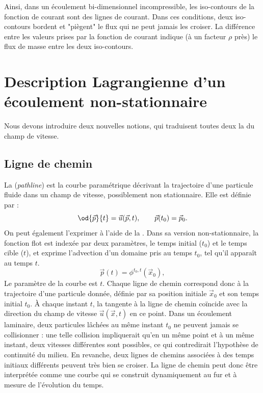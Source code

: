 Ainsi, dans un écoulement bi-dimensionnel incompressible, les iso-contours de la fonction de courant sont des lignes de courant. Dans ces conditions, deux iso-contours bordent et "piègent" le flux qui ne peut jamais les croiser. La différence entre les valeurs prises par la fonction de courant indique (à un facteur $\rho$ près) le flux de masse entre les deux iso-contours.

\section{Description Lagrangienne d'un écoulement non-stationnaire}
Nous devons introduire deux nouvelles notions, qui traduisent toutes deux la  du champ de vitesse.

\subsection{Ligne de chemin}
La  (\emph{pathline}) est la courbe paramétrique décrivant la trajectoire d’une particule fluide dans un champ de vitesse, possiblement non stationnaire. Elle est définie par :
\begin{equation}
  \od{\vec{p}}{t} = \vec{u}(\vec{p},t), \qquad \vec{p}(t_0) = \vec{p}_0.
  \label{eq:ligne_chemin}
\end{equation}
On peut également l’exprimer à l’aide de la . Dans sa version non-stationnaire, la fonction flot est indexée par deux paramètres, le temps initial ($t_0$) et le temps cible ($t$), et exprime l'advection d'un domaine pris au temps $t_0$, tel qu'il apparaît au temps $t$.
\begin{equation}
  \vec{p}(t) = \phi^{t_0, t }(\vec{x}_0),
  \label{eq:ligne_chemin_flot}
\end{equation}
Le paramètre de la courbe est $t$.
Chaque ligne de chemin correspond donc à la trajectoire d’une particule donnée, définie par sa position initiale $\vec{x}_0$ et son temps initial $t_0$.
À chaque instant $t$, la tangente à la ligne de chemin coïncide avec la direction du champ de vitesse $\vec{u}(\vec{x},t)$ en ce point.
Dans un écoulement laminaire, deux particules lâchées au même instant $t_0$ ne peuvent jamais se collisionner : une telle collision impliquerait qu’en un même point et à un même instant, deux vitesses différentes sont possibles, ce qui contredirait l’hypothèse de continuité du milieu. En revanche, deux lignes de chemins associées à des temps initiaux différents peuvent très bien se croiser.
La ligne de chemin peut donc être interprétée comme une courbe qui se construit dynamiquement au fur et à mesure de l’évolution du temps.

